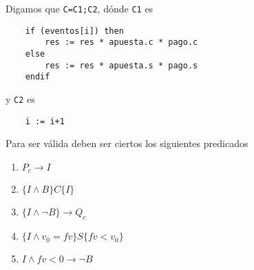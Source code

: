 \documentclass[../document.tex]{subfiles}
\begin{document}
Digamos que \verb+C=C1;C2+, dónde \verb+C1+ es
\begin{verbatim}
    if (eventos[i]) then
        res := res * apuesta.c * pago.c
    else
        res := res * apuesta.s * pago.s
    endif
\end{verbatim}

y \verb+C2+ es
\begin{verbatim}
    i := i+1
\end{verbatim}

Para ser válida deben ser ciertos los siguientes predicados
\begin{enumerate}
    \item $P_c \to I$
    \item $\{I \land B\}C\{I\}$
    \item $\{I \land \neg B\} \to Q_c$
    \item $\{I \land v_0 = fv\} S \{fv < v_0\}$
    \item $I \land fv<0 \to \neg B$
\end{enumerate}
\end{document}

